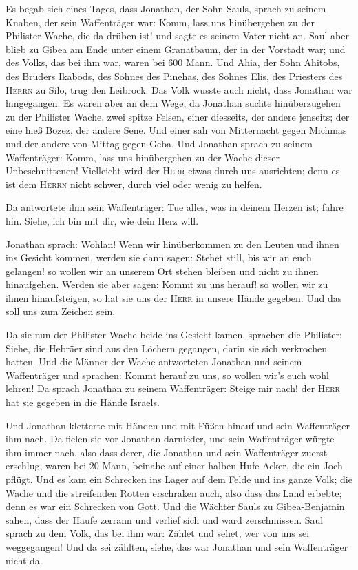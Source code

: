  Es begab sich eines Tages, dass Jonathan, der Sohn Sauls,
sprach zu seinem Knaben, der sein Waffenträger war: Komm, lass uns
hinübergehen zu der Philister Wache, die da drüben ist! und sagte es
seinem Vater nicht an.  Saul aber blieb zu Gibea am Ende
unter einem Granatbaum, der in der Vorstadt war; und des Volks, das bei
ihm war, waren bei 600 Mann.  Und Ahia, der Sohn Ahitobs,
des Bruders Ikabods, des Sohnes des Pinehas, des Sohnes Elis, des
Priesters des \textsc{Herrn} zu Silo, trug den Leibrock. Das Volk wusste
auch nicht, dass Jonathan war hingegangen.  Es waren aber
an dem Wege, da Jonathan suchte hinüberzugehen zu der Philister Wache,
zwei spitze Felsen, einer diesseits, der andere jenseits; der eine hieß
Bozez, der andere Sene.  Und einer sah von Mitternacht
gegen Michmas und der andere von Mittag gegen Geba.  Und
Jonathan sprach zu seinem Waffenträger: Komm, lass uns hinübergehen zu
der Wache dieser Unbeschnittenen! Vielleicht wird der \textsc{Herr}
etwas durch uns ausrichten; denn es ist dem \textsc{Herrn} nicht schwer,
durch viel oder wenig zu helfen.

 Da antwortete ihm sein Waffenträger: Tue alles, was in
deinem Herzen ist; fahre hin. Siehe, ich bin mit dir, wie dein Herz
will.

 Jonathan sprach: Wohlan! Wenn wir hinüberkommen zu den
Leuten und ihnen ins Gesicht kommen,  werden sie dann
sagen: Stehet still, bis wir an euch gelangen! so wollen wir an unserem
Ort stehen bleiben und nicht zu ihnen hinaufgehen. 
Werden sie aber sagen: Kommt zu uns herauf! so wollen wir zu ihnen
hinaufsteigen, so hat sie uns der \textsc{Herr} in unsere Hände gegeben.
Und das soll uns zum Zeichen sein.

 Da sie nun der Philister Wache beide ins Gesicht kamen,
sprachen die Philister: Siehe, die Hebräer sind aus den Löchern
gegangen, darin sie sich verkrochen hatten.  Und die
Männer der Wache antworteten Jonathan und seinem Waffenträger und
sprachen: Kommt herauf zu uns, so wollen wir's euch wohl lehren! Da
sprach Jonathan zu seinem Waffenträger: Steige mir nach! der
\textsc{Herr} hat sie gegeben in die Hände Israels.

 Und Jonathan kletterte mit Händen und mit Füßen hinauf
und sein Waffenträger ihm nach. Da fielen sie vor Jonathan darnieder,
und sein Waffenträger würgte ihm immer nach,  also dass
derer, die Jonathan und sein Waffenträger zuerst erschlug, waren bei 20
Mann, beinahe auf einer halben Hufe Acker, die ein Joch pflügt.
 Und es kam ein Schrecken ins Lager auf dem Felde und ins
ganze Volk; die Wache und die streifenden Rotten erschraken auch, also
dass das Land erbebte; denn es war ein Schrecken von Gott.
 Und die Wächter Sauls zu Gibea-Benjamin sahen, dass der
Haufe zerrann und verlief sich und ward zerschmissen. 
Saul sprach zu dem Volk, das bei ihm war: Zählet und sehet, wer von uns
sei weggegangen! Und da sei zählten, siehe, das war Jonathan und sein
Waffenträger nicht da.

